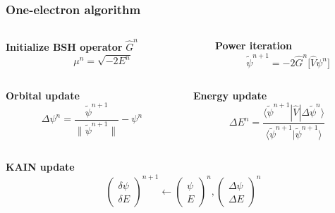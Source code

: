 \documentclass[mathserif, 10pt]{beamer}
\begin{document}
\begin{frame}
    \frametitle{One-electron algorithm}

    \begin{columns}
    \begin{column}{.50\textwidth}
    \centering
    \textbf{Initialize BSH operator} $\hat{G}^n$
    \begin{equation}
        \nonumber
        \mu^n = \sqrt{-2E^n}
    \end{equation}
    \end{column}

    \begin{column}{.50\textwidth}
    \centering
    \textbf{Power iteration}
    \begin{equation}
	\nonumber
	\tilde{\psi}^{n+1} = -2\hat{G}^n \Big[ \hat{V} \psi^n \Big]
    \end{equation}
    \end{column}
    \end{columns}

    \vspace{5mm}

    \begin{columns}
    \begin{column}{.50\textwidth}
    \centering
    \textbf{Orbital update}
    \begin{equation}
	\nonumber
	\Delta\psi^n = \frac{\tilde{\psi}^{n+1}}{\|\tilde{\psi}^{n+1}\|} - \psi^n
    \end{equation}
    \end{column}

    \begin{column}{.50\textwidth}
    \centering
    \textbf{Energy update}
    \begin{equation}
	\nonumber
	\Delta E^n =
        \frac{\langle\tilde{\psi}^{n+1}|\hat{V}|\Delta\tilde{\psi}^n\rangle}
        {\langle\tilde{\psi}^{n+1}|\tilde{\psi}^{n+1}\rangle}
    \end{equation}
    \end{column}
    \end{columns}

    \vspace{5mm}

    \centering
    \textbf{KAIN update}
    \begin{equation}
	\nonumber
        \left(
        \begin{matrix}
        \delta \psi\\
        \delta E
        \end{matrix}
        \right)^{n+1}
        \longleftarrow
        \left(
        \begin{matrix}
        \psi\\
        E
        \end{matrix}
        \right)^n
        ,
        \left(
        \begin{matrix}
        \Delta \psi\\
        \Delta E
        \end{matrix}
        \right)^n
    \end{equation}


\end{frame}
\end{document}
